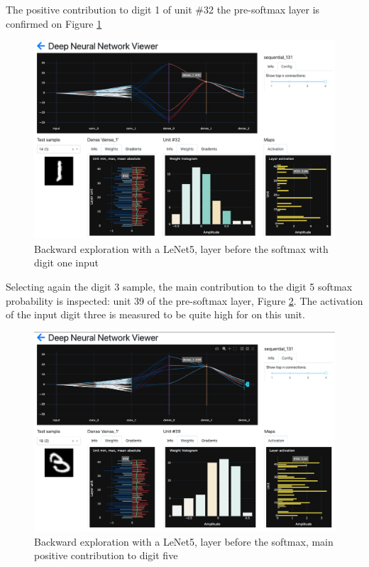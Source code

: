 The positive contribution to digit 1 of unit \#32 the pre-softmax layer is confirmed on Figure \ref{fig:dnn-viewer-backward-3}

\begin{figure}[H]
    \centering
    \includegraphics[scale=0.3]{images/dnn-viewer/BackwardThree_3.png}
    \caption{Backward exploration with a LeNet5, layer before the softmax with digit one input}
    \label{fig:dnn-viewer-backward-3}
\end{figure}

Selecting again the digit 3 sample, the main contribution to the digit 5 softmax probability is inspected: unit 39 of the pre-softmax layer, Figure \ref{fig:dnn-viewer-backward-4}. The activation of the input digit three is measured to be quite high for on this unit.

\begin{figure}[H]
    \centering
    \includegraphics[scale=0.3]{images/dnn-viewer/BackwardThree_4.png}
    \caption{Backward exploration with a LeNet5, layer before the softmax, main positive contribution to digit five}
    \label{fig:dnn-viewer-backward-4}
\end{figure}

